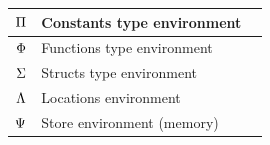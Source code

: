 \begin{table}[!ht]
{\begin{tabular}{rll}
			$\Pi$                                           & Constants type environment       &                                           \\\hline
			$\Phi$                                            & Functions type environment       &                                           \\\hline
			$\Sigma$                                          & Structs type environment         &                                           \\\hline
			$\Lambda$                                             & Locations environment            &                                           \\\hline
			$\Psi$                                           & Store environment (memory)       &                                           \\\hline
		\end{tabular}
	}
\end{table}

